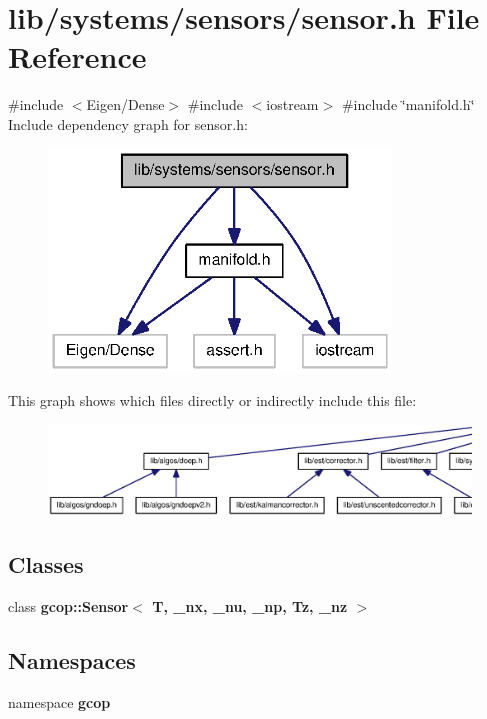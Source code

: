 \section{lib/systems/sensors/sensor.h \-File \-Reference}
\label{sensor_8h}
{\ttfamily \#include $<$\-Eigen/\-Dense$>$}\*
{\ttfamily \#include $<$iostream$>$}\*
{\ttfamily \#include \char`\"{}manifold.\-h\char`\"{}}\*
\-Include dependency graph for sensor.\-h\-:
\nopagebreak
\begin{figure}[H]
\begin{center}
\leavevmode
\includegraphics[width=258pt]{sensor_8h__incl}
\end{center}
\end{figure}
\-This graph shows which files directly or indirectly include this file\-:
\nopagebreak
\begin{figure}[H]
\begin{center}
\leavevmode
\includegraphics[width=350pt]{sensor_8h__dep__incl}
\end{center}
\end{figure}
\subsection*{\-Classes}
\begin{DoxyCompactItemize}
\item 
class {\bf gcop\-::\-Sensor$<$ T, \-\_\-nx, \-\_\-nu, \-\_\-np, Tz, \-\_\-nz $>$}
\end{DoxyCompactItemize}
\subsection*{\-Namespaces}
\begin{DoxyCompactItemize}
\item 
namespace {\bf gcop}
\end{DoxyCompactItemize}
